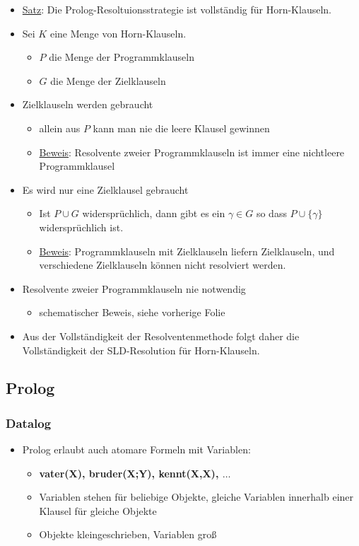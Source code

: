 \documentclass{scrartcl}
\begin{document}
\begin{itemize}
	\item \underline{Satz}: Die Prolog-Resoltuionsstrategie ist vollständig für Horn-Klauseln.
	\item Sei $K$ eine Menge von Horn-Klauseln.
	\begin{itemize}
		\item $P$ die Menge der Programmklauseln
		\item $G$ die Menge der Zielklauseln
	\end{itemize}
	\item Zielklauseln werden gebraucht
	\begin{itemize}
		\item allein aus $P$ kann man nie die leere Klausel gewinnen
		\item \underline{Beweis}: Resolvente zweier Programmklauseln ist immer eine nichtleere Programmklausel
	\end{itemize}
	\item Es wird nur eine Zielklausel gebraucht
	\begin{itemize}
		\item Ist $P \cup G$ widersprüchlich, dann gibt es ein $\gamma \in G$ so dass $P \cup \{ \gamma \}$ widersprüchlich ist.
		\item \underline{Beweis}: Programmklauseln mit Zielklauseln liefern Zielklauseln, und verschiedene Zielklauseln können nicht resolviert werden.
	\end{itemize}
	\item Resolvente zweier Programmklauseln nie notwendig
	\begin{itemize}
		\item schematischer Beweis, siehe vorherige Folie
	\end{itemize}
	\item Aus der Vollständigkeit der Resolventenmethode folgt daher die Vollständigkeit der SLD-Resolution für Horn-Klauseln.
\end{itemize}

\subsection{Prolog}

\subsubsection{Datalog}

\begin{itemize}
	\item Prolog erlaubt auch atomare Formeln mit Variablen:
	\begin{itemize}
		\item \textbf{vater(X), bruder(X;Y), kennt(X,X), $\ldots$}
		\item Variablen stehen für beliebige Objekte, gleiche Variablen innerhalb einer Klausel für gleiche Objekte
		\item Objekte kleingeschrieben, Variablen groß
	\end{itemize}
\end{itemize}
\end{document}
